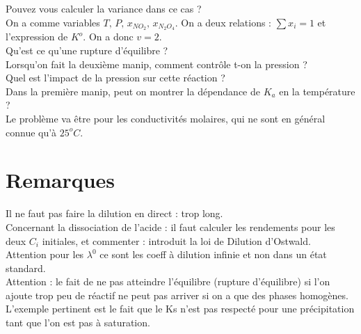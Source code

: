 \documentclass[12pt,prb,aps,epsf]{article}
\begin{document}
Pouvez vous calculer la variance dans ce cas ?\\
On a comme variables $T,\,P,\,x_{NO_2},\,x_{N_2O_4}$. On a deux relations : $\sum x_i = 1$ et l'expression de $K^o$. On a donc $v=2$.\\

Qu'est ce qu'une rupture d'équilibre ?\\

Lorsqu'on fait la deuxième manip, comment contrôle t-on la pression ?\\

Quel est l'impact de la pression sur cette réaction ?\\

Dans la première manip, peut on montrer la dépendance de $K_a$ en la température ?\\
Le problème va être pour les conductivités molaires, qui ne sont en général connue qu'à $25^oC$.

\section*{Remarques}
Il ne faut pas faire la dilution en direct : trop long.\\
Concernant la dissociation de l'acide : il faut calculer les rendements pour les deux $C_i$ initiales, et commenter : introduit la loi de Dilution d'Ostwald.\\
Attention pour les $\lambda^0$ ce sont les coeff à dilution infinie et non dans un état standard.\\
Attention : le fait de ne pas atteindre l'équilibre (rupture d'équilibre) si l'on ajoute trop peu de réactif ne peut pas arriver si on a que des phases homogènes. L'exemple pertinent est le fait que le Ks n'est pas respecté pour une précipitation tant que l'on est pas à saturation.
\end{document}
